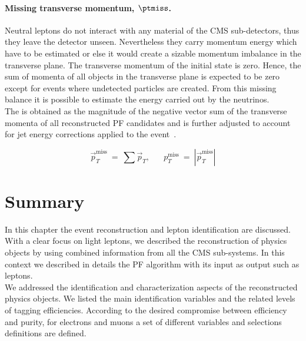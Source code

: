 \paragraph{Missing transverse momentum,
  $\boldsymbol{\ptmiss}$.}\label{sec:c2ptmiss}
Neutral leptons do not interact with any material of the CMS
sub-detectors, thus they leave the detector unseen. Nevertheless they
carry momentum energy which have to be estimated or else it would
create a sizable momentum imbalance in the transverse plane. The
transverse momentum of the initial state is zero. Hence, the sum of 
momenta of all objects in the transverse plane is
expected to be zero except for events where undetected particles are
created. From this missing balance it is possible to estimate the energy
carried out by the neutrinos. \\
The \ptmiss is obtained as the magnitude of the negative vector sum of the transverse momenta of 
all reconstructed PF candidates and is further adjusted to account for
jet energy corrections applied to the event~\cite{CMS-PAS-JME-16-004}.
\begin{linenomath}
  \begin{equation}
    \label{eq:c2ptmiss}
    \overrightarrow{p}_T^{\text{miss}} \: = \: \sum \overrightarrow{p}_T,
    \;\;\; \;\;\; p_T^{\text{miss}} \: = \: |\overrightarrow{p}_T^{\text{miss}}|
  \end{equation}
\end{linenomath}

\clearpage
\section{Summary}\label{sec:summaryC3}

In this chapter the event reconstruction and lepton identification are discussed.\\
With a clear focus on light leptons, we described the reconstruction
of physics objects by using combined information from all the CMS
sub-systems. In this context we
described in details the PF algorithm with its input as output such as
leptons. \\
We addressed the identification and characterization aspects of the
reconstructed physics objects. We listed the main identification
variables and the related levels of tagging efficiencies.
According to the desired compromise between efficiency and purity, 
for electrons and muons a set of different variables and selections definitions
are defined.

